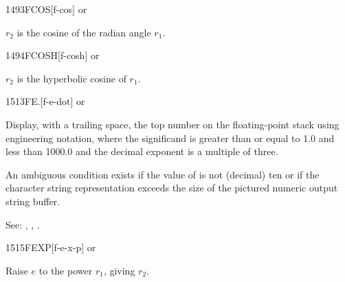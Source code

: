 \begin{newword}{1493}{FCOS}[f-cos]
	 or

	$r_2$ is the cosine of the radian angle $r_1$.
\end{newword}


\begin{newword}{1494}{FCOSH}[f-cosh]
	 or

	$r_2$ is the hyperbolic cosine of $r_1$.
\end{newword}


\begin{newword}{1513}{FE.}[f-e-dot]
	\stack{}{}  or

	Display, with a trailing space, the top number on the
	floating-point stack using engineering notation, where the
	significand is greater than or equal to 1.0 and less than
	1000.0 and the decimal exponent is a multiple of three.

	An ambiguous condition exists if the value of 
	is not (decimal) ten or if the character string representation
	exceeds the size of the pictured numeric output string buffer.

\item[See:]
	,
	,
	.
\end{newword}


\begin{newword}{1515}{FEXP}[f-e-x-p]
	 or

	Raise $e$ to the power $r_1$, giving $r_2$.
\end{newword}


